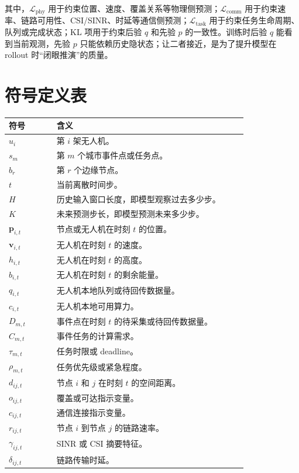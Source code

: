 ﻿\documentclass[UTF8,a4paper,11pt]{ctexart}
\begin{document}
其中，$\mathcal{L}_{\mathrm{phy}}$ 用于约束位置、速度、覆盖关系等物理侧预测；$\mathcal{L}_{\mathrm{comm}}$ 用于约束速率、链路可用性、CSI/SINR、时延等通信侧预测；$\mathcal{L}_{\mathrm{task}}$ 用于约束任务生命周期、队列或完成状态；KL 项用于约束后验 $q$ 和先验 $p$ 的一致性。训练时后验 $q$ 能看到当前观测，先验 $p$ 只能依赖历史隐状态；让二者接近，是为了提升模型在 rollout 时“闭眼推演”的质量。

\section{符号定义表}

\begin{longtable}{L{0.18\linewidth} L{0.72\linewidth}}
\toprule
符号 & 含义 \\
\midrule
$u_i$ & 第 $i$ 架无人机。\\
$s_m$ & 第 $m$ 个城市事件点或任务点。\\
$b_r$ & 第 $r$ 个边缘节点。\\
$t$ & 当前离散时间步。\\
$H$ & 历史输入窗口长度，即模型观察过去多少步。\\
$K$ & 未来预测步长，即模型预测未来多少步。\\
$\mathbf{p}_{i,t}$ & 节点或无人机在时刻 $t$ 的位置。\\
$\mathbf{v}_{i,t}$ & 无人机在时刻 $t$ 的速度。\\
$h_{i,t}$ & 无人机在时刻 $t$ 的高度。\\
$b_{i,t}$ & 无人机在时刻 $t$ 的剩余能量。\\
$q_{i,t}$ & 无人机本地队列或待回传数据量。\\
$c_{i,t}$ & 无人机本地可用算力。\\
$D_{m,t}$ & 事件点在时刻 $t$ 的待采集或待回传数据量。\\
$C_{m,t}$ & 事件任务的计算需求。\\
$\tau_{m,t}$ & 任务时限或 deadline。\\
$\rho_{m,t}$ & 任务优先级或紧急程度。\\
$d_{ij,t}$ & 节点 $i$ 和 $j$ 在时刻 $t$ 的空间距离。\\
$o_{ij,t}$ & 覆盖或可达指示变量。\\
$c_{ij,t}$ & 通信连接指示变量。\\
$r_{ij,t}$ & 节点 $i$ 到节点 $j$ 的链路速率。\\
$\gamma_{ij,t}$ & SINR 或 CSI 摘要特征。\\
$\delta_{ij,t}$ & 链路传输时延。\\

\end{longtable}
\end{document}
